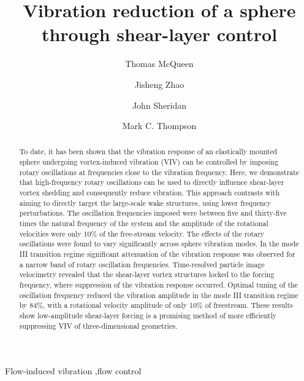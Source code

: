 \documentclass[3p]{elsarticle}
\begin{document}
\begin{frontmatter}

\title{Vibration reduction of a sphere through shear-layer
	control}

\author{Thomas McQueen}

\author{Jisheng Zhao}

\author{John Sheridan}

\author{Mark C. Thompson}


\address{Fluids Laboratory for Aeronautical and Industrial Research (FLAIR), Department of Mechanical and Aerospace Engineering, Monash University, Melbourne, VIC 3800, Australia}



\begin{abstract}
To date, it has been shown that the vibration response of an elastically mounted sphere undergoing vortex-induced vibration (VIV) can be controlled by imposing rotary oscillations at frequencies close to the vibration frequency. 
Here, we demonstrate that high-frequency rotary oscillations can be used to directly influence shear-layer vortex shedding and consequently reduce vibration. 
This approach contrasts with aiming to directly target the large-scale wake structures, using lower frequency perturbations. 
The oscillation frequencies imposed were between five and thirty-five times the natural frequency of the system and the amplitude of the rotational velocities were only 10\% of the free-stream velocity. 
The effects of the rotary oscillations were found to vary significantly across sphere vibration modes. 
In the mode III transition regime significant attenuation of the vibration response was observed for a narrow band of rotary oscillation frequencies. 
Time-resolved particle image velocimetry revealed that the shear-layer vortex structures locked to the forcing frequency, where suppression of the vibration response occurred. 
Optimal tuning of the oscillation frequency reduced the vibration amplitude in the mode III transition regime by 84\%, with a rotational velocity amplitude of only 10\% of freestream. 
These results show low-amplitude shear-layer forcing is a promising method of more efficiently suppressing VIV of three-dimensional geometries.
\end{abstract}

\begin{keyword}
Flow-induced vibration \sep flow control
\end{keyword}

\end{frontmatter}
\end{document}
